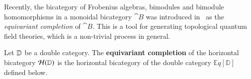 Recently, the bicategory of Frobenius algebras, bimodules and bimodule homomorphisms in a monoidal bicategory $\cat{B}$ was introduced in~\cite{carquevillerunkel} as the {\it equivariant completion }of $\cat{B}$. This is a tool for generating topological quantum field theories, which is a non-trivial process in general.

    
 
 
 
 
 



Let $\mathbb{D}$ be a double category. The {\bf equivariant completion} of the horizontal bicategory $\mathcal{H}(\mathbb{D})$ is the horizontal bicategory of the double category $\mathbb{E}q[{\mathbb{D}}]$ defined below.  

